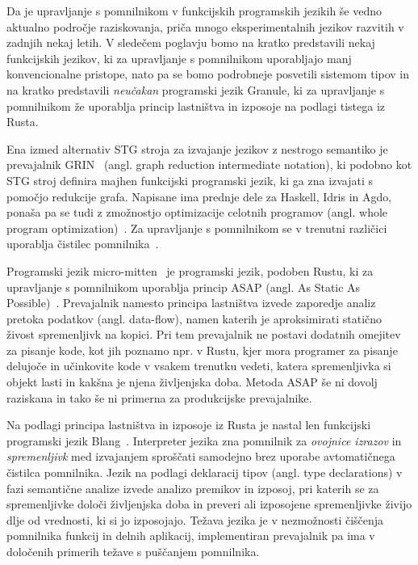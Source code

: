 Da je upravljanje s pomnilnikom v funkcijskih programskih jezikih še vedno aktualno področje raziskovanja, priča mnogo eksperimentalnih jezikov razvitih v zadnjih nekaj letih. V sledečem poglavju bomo na kratko predstavili nekaj funkcijskih jezikov, ki za upravljanje s pomnilnikom uporabljajo manj konvencionalne pristope, nato pa se bomo podrobneje posvetili sistemom tipov in na kratko predstavili \textit{neučakan} programski jezik Granule, ki za upravljanje s pomnilnikom že uporablja princip lastništva in izposoje na podlagi tistega iz Rusta.

Ena izmed alternativ STG stroja za izvajanje jezikov z nestrogo semantiko je  prevajalnik GRIN~\cite{boquist1997grin} (angl. graph reduction intermediate notation), ki podobno kot STG stroj definira majhen funkcijski programski jezik, ki ga zna izvajati s pomočjo redukcije grafa. Napisane ima prednje dele za Haskell, Idris in Agdo, ponaša pa se tudi z zmožnostjo optimizacije celotnih programov (angl. whole program optimization)~\cite{podlovics2022modern}. Za upravljanje s pomnilnikom se v trenutni različici uporablja čistilec pomnilnika~\cite{boquist1999code}.

Programski jezik micro-mitten~\cite{corbyn:practical-static-memory-management} je programski jezik, podoben Rustu, ki za upravljanje s pomnilnikom uporablja princip ASAP (angl. As Static As Possible)~\cite{proust2017asap}. Prevajalnik namesto principa lastništva izvede zaporedje analiz pretoka podatkov (angl. data-flow), namen katerih je aproksimirati statično živost spremenljivk na kopici. Pri tem prevajalnik ne postavi dodatnih omejitev za pisanje kode, kot jih poznamo npr. v Rustu, kjer mora programer za pisanje delujoče in učinkovite kode v vsakem trenutku vedeti, katera spremenljivka si objekt lasti in kakšna je njena življenjska doba. Metoda ASAP še ni dovolj raziskana in tako še ni primerna za produkcijske prevajalnike.

Na podlagi principa lastništva in izposoje iz Rusta je nastal len funkcijski programski jezik Blang~\cite{turk2022len}. Interpreter jezika zna pomnilnik za \emph{ovojnice izrazov} in \emph{spremenljivk} med izvajanjem sproščati samodejno brez uporabe avtomatičnega čistilca pomnilnika. Jezik na podlagi deklaracij tipov (angl. type declarations) v fazi semantične analize izvede analizo premikov in izposoj, pri katerih se za spremenljivke določi življenjska doba in preveri ali izposojene spremenljivke živijo dlje od vrednosti, ki si jo izposojajo. Težava jezika je v nezmožnosti čiščenja pomnilnika funkcij in delnih aplikacij, implementiran prevajalnik pa ima v določenih primerih težave s puščanjem pomnilnika.  
